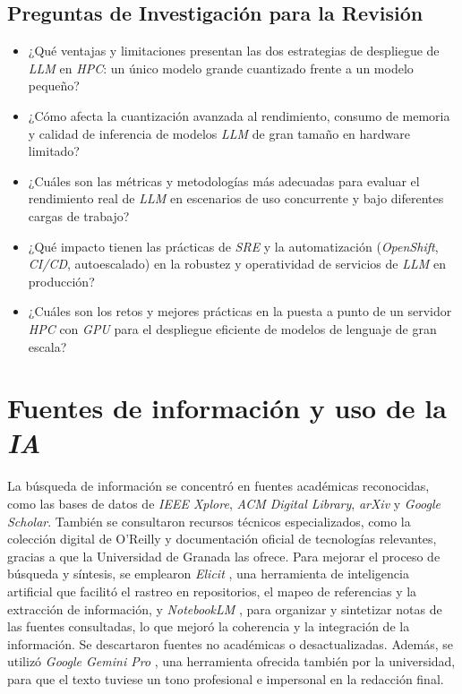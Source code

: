 \subsection{Preguntas de Investigación para la Revisión}
\begin{itemize}
    \item ¿Qué ventajas y limitaciones presentan las dos estrategias de despliegue de \textit{LLM} en \textit{HPC}: un único modelo grande cuantizado frente a un modelo pequeño?
    \item ¿Cómo afecta la cuantización avanzada al rendimiento, consumo de memoria y calidad de inferencia de modelos \textit{LLM} de gran tamaño en hardware limitado?
    \item ¿Cuáles son las métricas y metodologías más adecuadas para evaluar el rendimiento real de \textit{LLM} en escenarios de uso concurrente y bajo diferentes cargas de trabajo?
    \item ¿Qué impacto tienen las prácticas de \textit{SRE} y la automatización (\textit{OpenShift}, \textit{CI/CD}, autoescalado) en la robustez y operatividad de servicios de \textit{LLM} en producción?
    \item ¿Cuáles son los retos y mejores prácticas en la puesta a punto de un servidor \textit{HPC} con \textit{GPU} para el despliegue eficiente de modelos de lenguaje de gran escala?
\end{itemize}

\section*{Fuentes de información y uso de la \textit{IA}}
La búsqueda de información se concentró en fuentes académicas reconocidas, como las bases de datos de \textit{IEEE Xplore}, \textit{ACM Digital Library}, \textit{arXiv} y \textit{Google Scholar}. También se consultaron recursos técnicos especializados, como la colección digital de O'Reilly y documentación oficial de tecnologías relevantes, gracias a que la Universidad de Granada las ofrece. Para mejorar el proceso de búsqueda y síntesis, se emplearon \textit{Elicit} \cite{ref66}, una herramienta de inteligencia artificial que facilitó el rastreo en repositorios, el mapeo de referencias y la extracción de información, y \textit{NotebookLM} \cite{ref67}, para organizar y sintetizar notas de las fuentes consultadas, lo que mejoró la coherencia y la integración de la información. Se descartaron fuentes no académicas o desactualizadas. Además, se utilizó \textit{Google Gemini Pro} \cite{ref68}, una herramienta ofrecida también por la universidad, para que el texto tuviese un tono profesional e impersonal en la redacción final.


